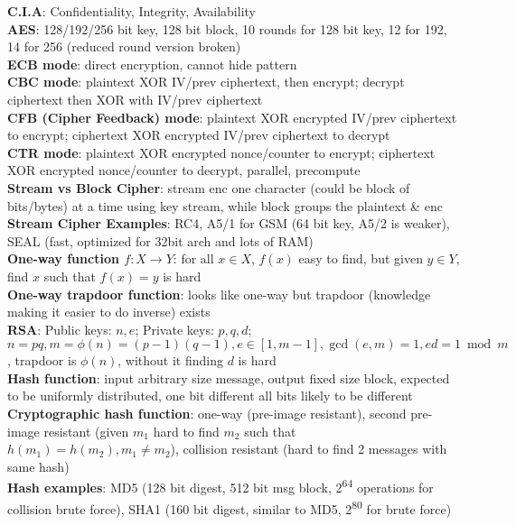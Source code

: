 \documentclass[a4paper]{article}
\begin{document}
    \begin{multicols}{2}
        \scriptsize
        \noindent\textbf{C.I.A}: Confidentiality, Integrity, Availability\\
        \textbf{AES}: 128/192/256 bit key, 128 bit block, 10 rounds for 128 bit key, 12 for 192, 14 for 256 (reduced round version broken)\\
        \textbf{ECB mode}: direct encryption, cannot hide pattern\\
        \textbf{CBC mode}: plaintext XOR IV/prev ciphertext, then encrypt; decrypt ciphertext then XOR with IV/prev ciphertext\\
        \textbf{CFB (Cipher Feedback) mode}: plaintext XOR encrypted IV/prev ciphertext to encrypt; ciphertext XOR encrypted IV/prev ciphertext to decrypt\\
        \textbf{CTR mode}: plaintext XOR encrypted nonce/counter to encrypt; ciphertext XOR encrypted nonce/counter to decrypt, parallel, precompute\\
        \textbf{Stream vs Block Cipher}: stream enc one character (could be block of bits/bytes) at a time using key stream, while block groups the plaintext \& enc\\
        \textbf{Stream Cipher Examples}: RC4, A5/1 for GSM (64 bit key, A5/2 is weaker), SEAL (fast, optimized for 32bit arch and lots of RAM)\\
        \textbf{One-way function $f: X \to Y$}: for all $x \in X$, $f(x)$ easy to find, but given $y \in Y$, find $x$ such that $f(x)=y$ is hard\\
        \textbf{One-way trapdoor function}: looks like one-way but trapdoor (knowledge making it easier to do inverse) exists\\
        \textbf{RSA}: Public keys: $n, e$; Private keys: $p, q, d$; $n=pq, m=\phi(n)=(p-1)(q-1), e \in [1, m-1], \gcd(e,m)=1, ed=1 \bmod m$, trapdoor is $\phi(n)$, without it finding $d$ is hard\\
        \textbf{Hash function}: input arbitrary size message, output fixed size block, expected to be uniformly distributed, one bit different all bits likely to be different\\
        \textbf{Cryptographic hash function}: one-way (pre-image resistant), second pre-image resistant (given $m_1$ hard to find $m_2$ such that $h(m_1)=h(m_2), m_1 \neq m_2$), collision resistant (hard to find 2 messages with same hash)\\
        \textbf{Hash examples}: MD5 (128 bit digest, 512 bit msg block, 2\textsuperscript{64} operations for collision brute force), SHA1 (160 bit digest, similar to MD5, 2\textsuperscript{80} for brute force)\\

\end{multicols}
\end{document}
